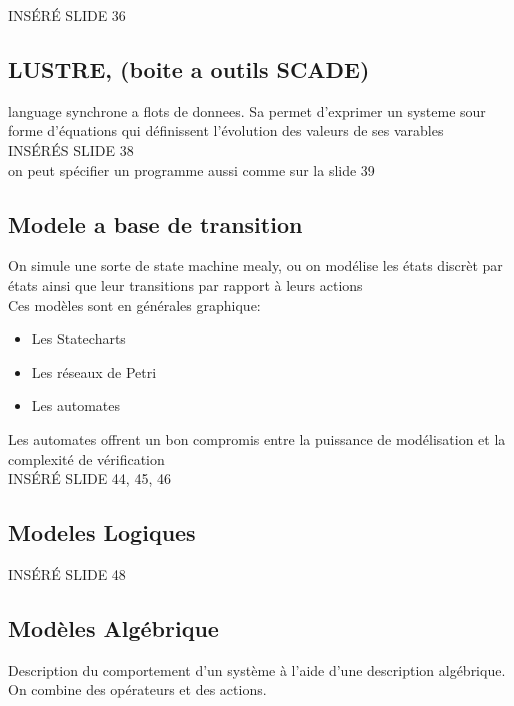 \documentclass[oneside]{book}
\begin{document}
    INSÉRÉ SLIDE 36\\
    
    \subsection{LUSTRE, (boite a outils SCADE)}
    language synchrone a flots de donnees. Sa permet d'exprimer un systeme sour forme d'équations qui définissent l'évolution des valeurs de ses varables\\
    
    INSÉRÉS SLIDE 38\\
    
    on peut spécifier un programme aussi comme sur la slide 39\\
    
    \subsection{Modele a base de transition}
    On simule une sorte de state machine mealy, ou on modélise les états discrèt par états ainsi que leur transitions par rapport à leurs actions\\
    
    Ces modèles sont en générales graphique:
    \begin{itemize}
        \item Les Statecharts
        \item Les réseaux de Petri
        \item Les automates
    \end{itemize}

    Les automates offrent un bon compromis entre la puissance de modélisation et la complexité de vérification\\
    
    INSÉRÉ SLIDE 44, 45, 46\\
    
    \subsection{Modeles Logiques}
    
    INSÉRÉ SLIDE 48\\
    
    \subsection{Modèles Algébrique}
    
    Description du comportement d'un système à l'aide d'une description algébrique. On combine des opérateurs et des actions.\\
    
\end{document}
